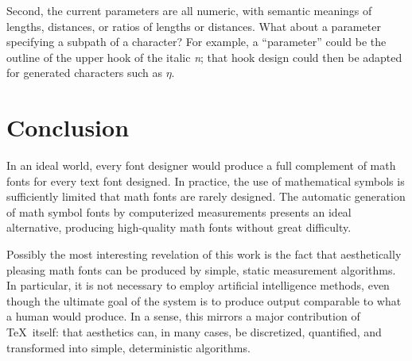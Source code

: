 \documentclass[preprint]{ltugproc}
\begin{document}
Second, the current parameters are all numeric, with semantic meanings of
lengths, distances, or ratios of lengths or distances. What about a parameter
specifying a subpath of a character? For example, a ``parameter'' could be the
outline of the upper hook of the italic \emph{n}; that hook design could then be
adapted for generated characters such as $\eta$.

\section{Conclusion}

In an ideal world, every font designer would produce a full complement of math
fonts for every text font designed. In practice, the use of mathematical symbols
is sufficiently limited that math fonts are rarely designed. The automatic
generation of math symbol fonts by computerized measurements presents an ideal
alternative, producing high-quality math fonts without great difficulty.

Possibly the most interesting revelation of this work is the fact that
aesthetically pleasing math fonts can be produced by simple, static measurement
algorithms. In particular, it is not necessary to employ artificial intelligence
methods, even though the ultimate goal of the system is to produce output
comparable to what a human would produce. In a sense, this mirrors a major
contribution of \TeX\ itself: that aesthetics can, in many cases, be
discretized, quantified, and transformed into simple, deterministic algorithms.


\end{document}
